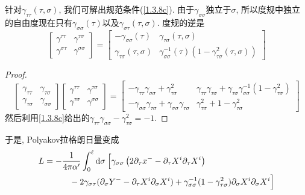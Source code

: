 针对$\gamma_{\tau\tau}(\tau,\sigma)$, 我们可解出规范条件(\ref{1.3.8c}). 由于$\gamma_{\sigma\sigma}$独立于$\sigma$, 所以度规中独立的自由度现在只有$\gamma_{\sigma\sigma}(\tau)$以及$\gamma_{\sigma\tau}(\tau,\sigma)$. 度规的逆是
\begin{equation}
\begin{bmatrix}
\gamma^{\tau \tau} & \gamma^{\tau \sigma} \\
\gamma^{\sigma \tau} & \gamma^{\sigma \sigma}
\end{bmatrix}=
\begin{bmatrix}
-\gamma_{\sigma \sigma}(\tau) & \gamma_{\tau \sigma}(\tau, \sigma) \\
\gamma_{\tau \sigma}(\tau, \sigma) & \gamma_{\sigma \sigma}^{-1}(\tau)\left(1-\gamma_{\tau \sigma}^{2}(\tau, \sigma)\right)
\end{bmatrix}
\end{equation}
\begin{tcolorbox}
    \begin{proof}
        \[
    \begin{bmatrix}
    \gamma_{\tau \tau} & \gamma_{\tau \sigma} \\
    \gamma_{\tau \sigma} & \gamma_{\sigma\sigma}
    \end{bmatrix}
    \begin{bmatrix}
    \gamma^{\tau\tau} & \gamma^{\tau \sigma} \\
    \gamma^{\tau \sigma} & \gamma^{\sigma \sigma}
    \end{bmatrix}
    =\begin{bmatrix}
        -\gamma_{\tau \tau} \gamma_{\sigma \sigma}+\gamma_{\tau \sigma}^{2} & \gamma_{\tau\tau} \gamma_{\tau \sigma}+\gamma_{\tau \sigma} \gamma_{\sigma \sigma}^{-1}\left(1-\gamma_{\tau \sigma}^{2}\right) \\
        -\gamma_{\sigma \sigma} \gamma_{\tau \sigma}+\gamma_{\sigma \sigma} \gamma_{\tau \sigma} & \gamma_{\tau \sigma}^{2}+1-\gamma_{\tau \sigma}^{2}  
    \end{bmatrix}
    \]
    然后利用\eqref{1.3.8c}给出的$\gamma_{\tau\tau} \gamma_{\sigma \sigma}-\gamma_{\tau \sigma}^{2}=-1$.
    \end{proof} 
\end{tcolorbox}
\noindent 于是, Polyakov拉格朗日量变成
\begin{equation}
\begin{aligned}
L&=-\frac{1}{4 \pi \alpha^{\prime}} \int_{0}^{\ell} \mathrm{d}\sigma\: \Bigl[\gamma_{\sigma \sigma}\left(2 \partial_{\tau} x^{-}-\partial_{\tau} X^{i} \partial_{\tau} X^{i}\right) \\
&\qquad \quad-2 \gamma_{\sigma \tau}(\partial_{\sigma} Y^{-}-\partial_{\tau} X^{i} \partial_{\sigma} X^{i})
+\gamma_{\sigma \sigma}^{-1}(1-\gamma_{\tau \sigma}^{2}) \partial_{\sigma} X^{i} \partial_{\sigma} X^{i}\Bigr]
\end{aligned}
\end{equation}
